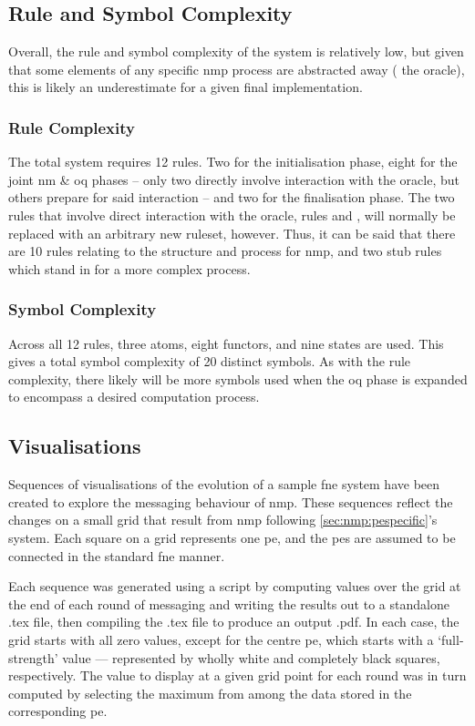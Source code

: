\subsection{Rule and Symbol Complexity}
Overall, the rule and symbol complexity of the system is relatively low, but given that some elements of any specific \gls{nmp} process are abstracted away (\eg{} the oracle), this is likely an underestimate for a given final implementation.

\subsubsection{Rule Complexity}
The total system requires 12 rules.  Two for the initialisation phase, eight for the joint \gls{nm} \& \gls{oq} phases -- only two directly involve interaction with the oracle, but others prepare for said interaction -- and two for the finalisation phase.  The two rules that involve direct interaction with the oracle, rules  and , will normally be replaced with an arbitrary new \gls{ruleset}, however.  Thus, it can be said that there are 10 rules relating to the structure and process for \gls{nmp}, and two stub rules which stand in for a more complex process.

\subsubsection{Symbol Complexity}
Across all 12 rules, three atoms, eight functors, and nine states are used.  This gives a total symbol complexity of 20 distinct symbols.  As with the rule complexity, there likely will be more symbols used when the \gls{oq} phase is expanded to encompass a desired computation process.

\subsection{Visualisations}
Sequences of visualisations of the evolution of a sample \gls{fne} system have been created to explore the messaging behaviour of \gls{nmp}.  These sequences reflect the changes on a small grid that result from \gls{nmp} following \cref{sec:nmp:pespecific}'s system.  Each square on a grid represents one \gls{pe}, and the \glspl{pe} are assumed to be connected in the standard \gls{fne} manner.

Each sequence was generated using a script by computing values over the grid at the end of each round of messaging and writing the results out to a standalone .tex file, then compiling the .tex file to produce an output .pdf.  In each case, the grid starts with all zero values, except for the centre \gls{pe}, which starts with a `full-strength' value --- represented by wholly white and completely black squares, respectively.  The value to display at a given grid point for each round was in turn computed by selecting the maximum from among the data stored in the corresponding \gls{pe}.


